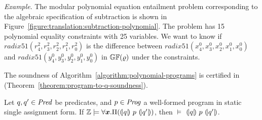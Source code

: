 \noindent
\emph{Example}.
The modular polynomial equation entailment problem corresponding to the
algebraic specification of subtraction is shown in
Figure~\ref{figure:translation:subtraction-polynomial}. The problem
has 15 polynomial equality constraints with 25 variables. We 
want to know if $\mathit{radix51}({r}^2_4, {r}^2_3, {r}^2_2,
{r}^2_1, {r}^2_0)$ is the difference between $\mathit{radix51}({x}^0_4,
{x}^0_3, {x}^0_2, {x}^0_1, {x}^0_0)$ and $\mathit{radix51}({y}^0_4,
{y}^0_3, {y}^0_2, {y}^0_1, {y}^0_0)$ in $\mathbb{GF}(\varrho)$ under the
constraints. 

The soundness of Algorithm~\ref{algorithm:polynomial-programs}
is certified in \coq (Theorem~\ref{theorem:program-to-q-soundness}).
\begin{theorem}
  \label{theorem:program-to-q-soundness}
  Let $q, q' \in \mathit{Pred}$ be predicates, and $p \in \mathit{Prog}$ a well-formed
  program in static single assignment form.
  If $\bbfZ \models \forall \vx.\Pi(\hoaretriple{q}{p}{q'})$, then
  $\models$ ${(\!|}{q}{|\!)}~{p}~{(\!|}{q'}{|\!)}$.
\end{theorem}

